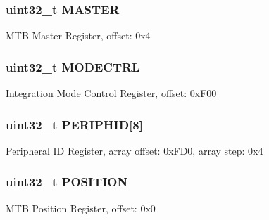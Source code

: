 \subsubsection[{M\+A\+S\+T\+E\+R}]{\setlength{\rightskip}{0pt plus 5cm}uint32\+\_\+t M\+A\+S\+T\+E\+R}\label{struct_m_t_b___mem_map_aa18cd97b47bac5b1af2e21151a28fce1}
M\+T\+B Master Register, offset\+: 0x4 \hypertarget{struct_m_t_b___mem_map_a0ac5ad9012eeb1338d251d4fbf72dffb}{}
\subsubsection[{M\+O\+D\+E\+C\+T\+R\+L}]{\setlength{\rightskip}{0pt plus 5cm}uint32\+\_\+t M\+O\+D\+E\+C\+T\+R\+L}\label{struct_m_t_b___mem_map_a0ac5ad9012eeb1338d251d4fbf72dffb}
Integration Mode Control Register, offset\+: 0x\+F00 \hypertarget{struct_m_t_b___mem_map_ab6fdc70dd1345592145d79d210ee616d}{}
\subsubsection[{P\+E\+R\+I\+P\+H\+I\+D}]{\setlength{\rightskip}{0pt plus 5cm}uint32\+\_\+t P\+E\+R\+I\+P\+H\+I\+D\mbox{[}8\mbox{]}}\label{struct_m_t_b___mem_map_ab6fdc70dd1345592145d79d210ee616d}
Peripheral I\+D Register, array offset\+: 0x\+F\+D0, array step\+: 0x4 \hypertarget{struct_m_t_b___mem_map_a2cd67baaacfdc2b6a991ed2099abd6cd}{}
\subsubsection[{P\+O\+S\+I\+T\+I\+O\+N}]{\setlength{\rightskip}{0pt plus 5cm}uint32\+\_\+t P\+O\+S\+I\+T\+I\+O\+N}\label{struct_m_t_b___mem_map_a2cd67baaacfdc2b6a991ed2099abd6cd}
M\+T\+B Position Register, offset\+: 0x0 \hypertarget{struct_m_t_b___mem_map_a770a2c3d064a4ccfac867429f7b677da}{}
